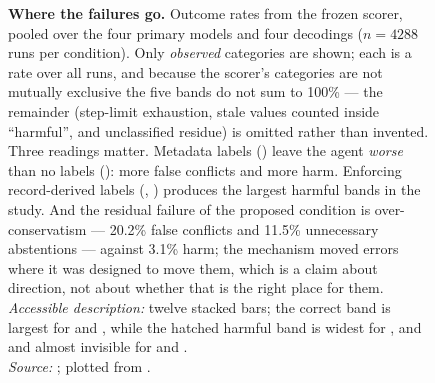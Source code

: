 \begin{figure}[t]
\vspace{4mm}
\caption[Observed failure categories by condition]{%
\textbf{Where the failures go.} Outcome rates from the frozen scorer, pooled over the four primary models and four
decodings ($n=4288$ runs per condition). Only \emph{observed} categories are shown; each is a rate over all runs,
and because the scorer's categories are not mutually exclusive the five bands do not sum to 100\% --- the
remainder (step-limit exhaustion, stale values counted inside ``harmful'', and unclassified residue) is omitted
rather than invented. Three readings matter. Metadata labels () leave the agent \emph{worse} than no labels
(): more false conflicts and more harm. Enforcing record-derived labels (, ) produces the
largest harmful bands in the study. And the residual failure of the proposed condition  is
over-conservatism --- 20.2\% false conflicts and 11.5\% unnecessary abstentions --- against 3.1\% harm; the
mechanism moved errors where it was designed to move them, which is a claim about direction, not about whether
that is the right place for them.\\
\emph{Accessible description:} twelve stacked bars; the correct band is largest for  and
, while the hatched harmful band is widest for ,  and  and almost invisible for
 and .\\
\emph{Source:} ; plotted from
.}
\label{fig:failures}
\end{figure}

